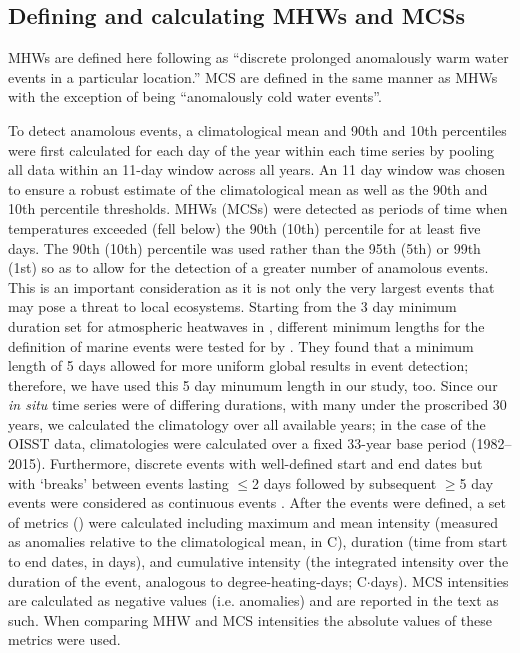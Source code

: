 \documentclass[a4paper,10pt,review]{elsarticle}
\begin{document}
\subsection{Defining and calculating MHWs and MCSs}
MHWs are defined here following \citet{Hobday2016} as ``discrete prolonged anomalously warm water events in a particular location.'' MCS are defined in the same manner as MHWs with the exception of being ``anomalously cold water events''.

To detect anamolous events, a climatological mean and 90th and 10th percentiles were first calculated for each day of the year within each time series by pooling all data within an 11-day window across all years. An 11 day window was chosen to ensure a robust estimate of the climatological mean as well as the 90th and 10th percentile thresholds. MHWs (MCSs) were detected as periods of time when temperatures exceeded (fell below) the 90th (10th) percentile for at least five days. The 90th (10th) percentile was used rather than the 95th (5th) or 99th (1st) so as to allow for the detection of a greater number of anamolous events. This is an important consideration as it is not only the very largest events that may pose a threat to local ecosystems. Starting from the 3 day minimum duration set for atmospheric heatwaves in \citet{Perkins2013}, different minimum lengths for the definition of marine events were tested for by \citet{Hobday2016}. They found that a minimum length of 5 days allowed for more uniform global results in event detection; therefore, we have used this 5 day minumum length in our study, too. Since our \emph{in situ} time series were of differing durations, with many under the proscribed 30 years, we calculated the climatology over all available years; in the case of the OISST data, climatologies were calculated over a fixed 33-year base period (1982--2015). Furthermore, discrete events with well-defined start and end dates but with `breaks' between events lasting $\leq$2 days followed by subsequent $\geq$5 day events were considered as continuous events \citep{Hobday2016}. After the events were defined, a set of metrics () were calculated including maximum and mean intensity (measured as anomalies relative to the climatological mean, in \degree C), duration (time from start to end dates, in days), and cumulative intensity (the integrated intensity over the duration of the event, analogous to degree-heating-days; \degree C$\cdot$days). MCS intensities are calculated as negative values (i.e. anomalies) and are reported in the text as such. When comparing MHW and MCS intensities the absolute values of these metrics were used.
\end{document}
